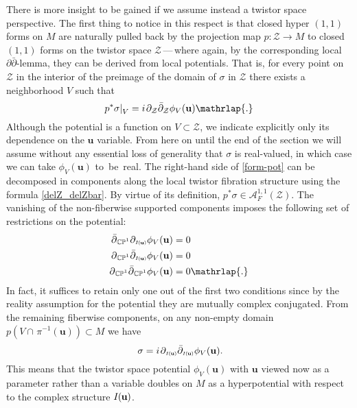 \documentclass[11pt]{amsart}
\theoremstyle{remark}
\theoremstyle{remark}
\theoremstyle{definition}
\theoremstyle{definition}
\theoremstyle{definition}
\newcommand{\IU}{I\nhp(\nhp\mathbf{u}\hspace{-0.2pt})} %
\newcommand{\Iu}{\scriptscriptstyle{I\nhp(\nhp\mathbf{u}\hspace{-0.25pt})}} %
\newcommand{\0}{{\scriptstyle 0'}} %
\newcommand{\1}{{\scriptstyle 1'}}
\newcommand{\pt}{\hspace{1pt}} %
\newcommand{\hp}{\hspace{0.5pt}} %
\newcommand{\nhp}{\hspace{-0.5pt}} %
\begin{document}
There is more insight to be gained if we assume instead a twistor space perspective. The first thing to notice in this respect is that closed hyper $(1,1)$ forms on $M$ are naturally pulled back by the projection map $p: \mathcal{Z} \rightarrow M$ to closed  $(1,1)$ forms on the twistor space $\mathcal{Z}$\,---\,where again, by the corresponding local \mbox{$\partial\bar{\partial}$\pt-\hp lemma}, they can be derived from local potentials. That is, for every point on $\mathcal{Z}$ in the interior of the preimage of the domain of $\sigma$ in $\mathcal{Z}$ there exists a neighborhood $V$ such that
\begin{equation} \label{form-pot}
p^*\sigma |_{V}^{\phantom{I}} = i \pt \partial_{\mathcal{Z}}\bar{\partial}_{\mathcal{Z}} \phi_V(\mathbf{u}) \mathrlap{.}
\end{equation}
Although the potential is a function on $V \subset \mathcal{Z}$, we indicate explicitly only its dependence on the $\mathbf{u}$ variable. From here on until the end of the section we will assume without any essential loss of generality that $\sigma$ is real-valued, in which case we can take $\phi_V(\mathbf{u})$ to~be~real. 
The right-hand side of \eqref{form-pot} can be decomposed in components along the local twistor fibration structure using the formula \eqref{delZ_delZbar}. By virtue of its definition, $p^*\sigma \in \mathscr{A}^{1,1}_F(\mathcal{Z})$. The vanishing of the non-fiberwise supported components imposes the following set of restrictions on the potential:
{\allowdisplaybreaks 
\begin{align}
\bar{\partial}_{\hp\smash{\mathbb{CP}^1}} \partial_{\Iu}\phi_V(\mathbf{u}) & = 0 \nonumber \\
\partial_{\hp\smash{\mathbb{CP}^1}} \bar{\partial}_{\Iu}\phi_V(\mathbf{u}) & = 0 \label{pot_constrs} \\
\partial_{\hp\smash{\mathbb{CP}^1}} \bar{\partial}_{\hp\smash{\mathbb{CP}^1}} \phi_V(\mathbf{u})& = 0 \mathrlap{.} \nonumber
\end{align}
}%
In fact, it suffices to retain only one out of the first two conditions since by the reality assumption for the potential they are mutually complex conjugated. From the remaining fiberwise components, on any non-empty domain $p(V \cap \pt \pi^{-1}(\mathbf{u})) \subset M$ we have
\begin{equation} \label{leeloo}
\sigma 
= i \pt \partial_{\Iu}\bar{\partial}_{\Iu} \phi_V(\mathbf{u}) \rlap{.}
\end{equation}
This means that the twistor space potential $\phi_V(\mathbf{u})$ with $\mathbf{u}$ viewed now as a parameter rather than a variable doubles on $M$ as a hyperpotential with respect to the complex structure $\IU$. 
\end{document}
